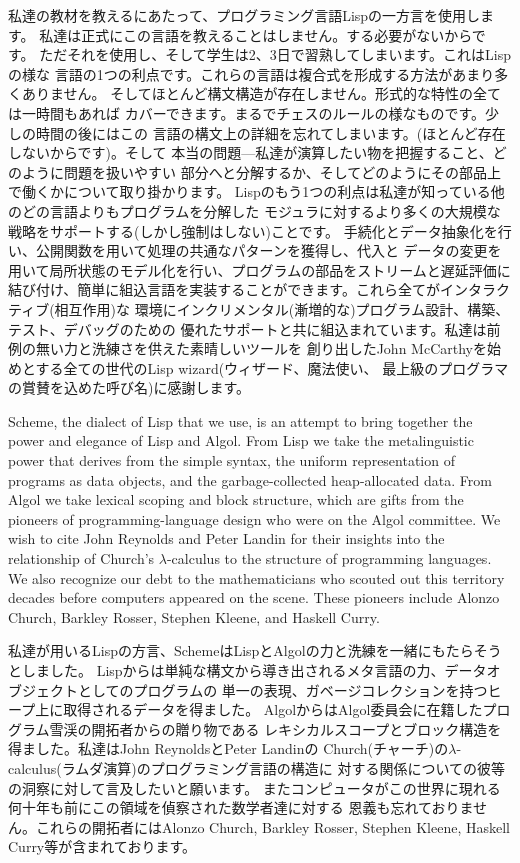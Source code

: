 \documentclass[oneside]{book}
\begin{document}
私達の教材を教えるにあたって、プログラミング言語Lispの一方言を使用します。
私達は正式にこの言語を教えることはしません。する必要がないからです。
ただそれを使用し、そして学生は2、3日で習熟してしまいます。これはLispの様な
言語の1つの利点です。これらの言語は複合式を形成する方法があまり多くありません。
そしてほとんど構文構造が存在しません。形式的な特性の全ては一時間もあれば
カバーできます。まるでチェスのルールの様なものです。少しの時間の後にはこの
言語の構文上の詳細を忘れてしまいます。(ほとんど存在しないからです)。そして
本当の問題---私達が演算したい物を把握すること、どのように問題を扱いやすい
部分へと分解するか、そしてどのようにその部品上で働くかについて取り掛かります。
Lispのもう1つの利点は私達が知っている他のどの言語よりもプログラムを分解した
モジュラに対するより多くの大規模な戦略をサポートする(しかし強制はしない)ことです。
手続化とデータ抽象化を行い、公開関数を用いて処理の共通なパターンを獲得し、代入と
データの変更を用いて局所状態のモデル化を行い、プログラムの部品をストリームと遅延評価に
結び付け、簡単に組込言語を実装することができます。これら全てがインタラクティブ(相互作用)な
環境にインクリメンタル(漸増的な)プログラム設計、構築、テスト、デバッグのための
優れたサポートと共に組込まれています。私達は前例の無い力と洗練さを供えた素晴しいツールを
創り出したJohn McCarthyを始めとする全ての世代のLisp wizard(ウィザード、魔法使い、
最上級のプログラマの賞賛を込めた呼び名)に感謝します。

Scheme, the dialect of Lisp that we use, is an attempt to bring together the
power and elegance of Lisp and Algol.  From Lisp we take the metalinguistic
power that derives from the simple syntax, the uniform representation of
programs as data objects, and the garbage-collected heap-allocated data.  From
Algol we take lexical scoping and block structure, which are gifts from the
pioneers of programming-language design who were on the Algol committee.  We
wish to cite John Reynolds and Peter Landin for their insights into the
relationship of Church's $\lambda$-calculus to the structure of programming
languages.  We also recognize our debt to the mathematicians who scouted out
this territory decades before computers appeared on the scene.  These pioneers
include Alonzo Church, Barkley Rosser, Stephen Kleene, and Haskell Curry.

私達が用いるLispの方言、SchemeはLispとAlgolの力と洗練を一緒にもたらそうとしました。
Lispからは単純な構文から導き出されるメタ言語の力、データオブジェクトとしてのプログラムの
単一の表現、ガベージコレクションを持つヒープ上に取得されるデータを得ました。
AlgolからはAlgol委員会に在籍したプログラム雪渓の開拓者からの贈り物である
レキシカルスコープとブロック構造を得ました。私達はJohn ReynoldsとPeter Landinの
Church(チャーチ)の$\lambda$-calculus(ラムダ演算)のプログラミング言語の構造に
対する関係についての彼等の洞察に対して言及したいと願います。
またコンピュータがこの世界に現れる何十年も前にこの領域を偵察された数学者達に対する
恩義も忘れておりません。これらの開拓者にはAlonzo Church, Barkley Rosser, Stephen Kleene,
Haskell Curry等が含まれております。
\end{document}
